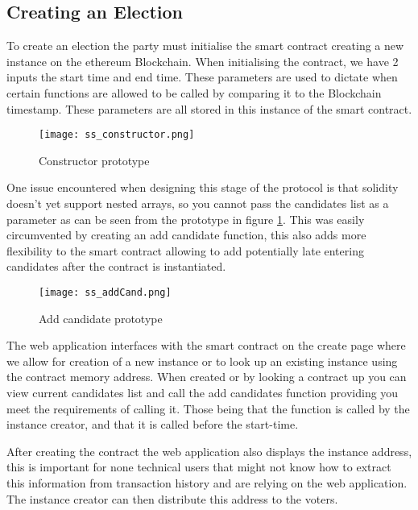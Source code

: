 \documentclass{entcs}
\begin{document}
\subsection{Creating an Election}

To create an election the party must initialise the smart contract creating a new instance on the ethereum Blockchain. When initialising the contract, we have 2 inputs the start time and end time. These parameters are used to dictate when certain functions are allowed to be called by comparing it to the Blockchain timestamp. These parameters are all stored in this instance of the smart contract.

\begin{figure}[h!]
    \centering
    \texttt{[image: ss\_constructor.png]}
    \caption{Constructor prototype}
    \label{fig:constructor}
\end{figure}


One issue encountered when designing this stage of the protocol is that solidity doesn't yet support nested arrays, so you cannot pass the candidates list as a parameter as can be seen from the prototype in figure \ref{fig:constructor}. This was easily circumvented by creating an add candidate function, this also adds more flexibility to the smart contract allowing to add potentially late entering candidates after the contract is instantiated. 

\begin{figure}[h!]
    \centering
    \texttt{[image: ss\_addCand.png]}
    \caption{Add candidate prototype}
    \label{fig:addCand}
\end{figure}

The web application interfaces with the smart contract on the create page where we allow for creation of a new instance or to look up an existing instance using the contract memory address. When created or by looking a contract up you can view current candidates list and call the add candidates function providing you meet the requirements of calling it. Those being that the function is called by the instance creator, and that it is called before the start-time.

After creating the contract the web application also displays the instance address, this is important for none technical users that might not know how to extract this information from transaction history and are relying on the web application. The instance creator can then distribute this address to the voters.
\end{document}
